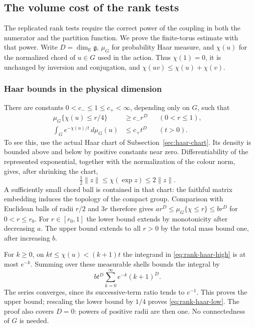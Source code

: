 \subsection{The volume cost of the rank tests}
\label{sec:rank-root-normalization}

The replicated rank tests require the correct power of the coupling in
both the numerator and the partition function. We prove the finite-torus
estimate with that power. Write $D=\dim_{\mathbb R}\mathfrak g$, $\mu_G$
for probability Haar measure, and $\chi(u)$ for the normalized chord of
$u\in G$ used in the action. Thus $\chi(1)=0$, it is unchanged by
inversion and conjugation, and $\chi(uv)\le\chi(u)+\chi(v)$.

\subsubsection{Haar bounds in the physical dimension}

There are constants $0<c_-\le1\le c_+<\infty$, depending only on $G$,
such that
\begin{align}
 \mu_G\{\chi(u)\le r/4\}&\ge c_-r^D &&(0<r\le1),
       \label{eq:rank-haar-low}\\
 \int_G e^{-\chi(u)/t}\,d\mu_G(u)&\le c_+t^D &&(t>0).
       \label{eq:rank-haar-high}
\end{align}
To see this, use the actual Haar chart of Subsection~\ref{sec:haar-chart}.
Its density is bounded above and below by positive constants near zero.
Differentiability of the represented exponential, together with the
normalization of the colour norm, gives, after shrinking the chart,
\[
 \tfrac12\|z\|\le\chi(\exp z)\le2\|z\|.
\]
A sufficiently small chord ball is contained in that chart: the faithful
matrix embedding induces the topology of the compact group. Comparison
with Euclidean balls of radii $r/2$ and $3r$ therefore gives
$a r^D\le\mu_G\{\chi\le r\}\le b r^D$ for $0<r\le r_0$.
For $r\in[r_0,1]$ the lower bound extends by monotonicity after decreasing
$a$. The upper bound extends to all $r>0$ by the total mass bound one,
after increasing $b$.

For $k\ge0$, on $kt\le\chi(u)<(k+1)t$ the integrand in
\eqref{eq:rank-haar-high} is at most $e^{-k}$. Summing over these
measurable shells bounds the integral by
\[
 b t^D\sum_{k=0}^\infty e^{-k}(k+1)^D.
\]
The series converges, since its successive-term ratio tends to $e^{-1}$.
This proves the upper bound; rescaling the lower bound by $1/4$ proves
\eqref{eq:rank-haar-low}. The proof also covers $D=0$: powers of positive
radii are then one. No connectedness of $G$ is needed.

